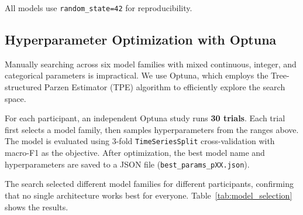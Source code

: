 \documentclass[conference]{IEEEtran}
\begin{document}
All models use \texttt{random\_state=42} for reproducibility.

\subsection{Hyperparameter Optimization with Optuna}

Manually searching across six model families with mixed continuous, integer, and categorical parameters is impractical. We use Optuna, which employs the Tree-structured Parzen Estimator (TPE) algorithm to efficiently explore the search space.

For each participant, an independent Optuna study runs \textbf{30 trials}. Each trial first selects a model family, then samples hyperparameters from the ranges above. The model is evaluated using 3-fold \texttt{TimeSeriesSplit} cross-validation with macro-F1 as the objective. After optimization, the best model name and hyperparameters are saved to a JSON file (\texttt{best\_params\_pXX.json}).

The search selected different model families for different participants, confirming that no single architecture works best for everyone. Table~\ref{tab:model_selection} shows the results.

\begin{table}[t]
\caption{Per-Participant Best Model and Macro F1 Score}
\begin{center}
\renewcommand{\arraystretch}{1.15}
\label{tab:model_selection}
\end{center}
\end{table}
\end{document}
